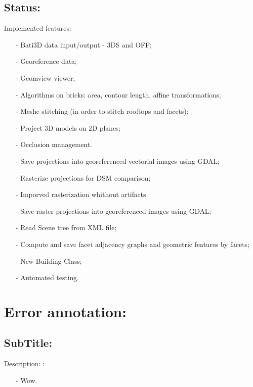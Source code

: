 \documentclass[9pt]{beamer}
\begin{document}
	\subsection[Status]{Status:}
	\begin{frame}[allowframebreaks]{Implemented features:}
		\begin{itemize}
				\item[-] Bati3D data input/output - 3DS and OFF;
				\item[-] Georeference data;
				\item[-] Geomview viewer;
				\item[-] Algorithms on bricks: area, contour length, affine transformations;
				\item[-] Meshe stitching (in order to stitch rooftops and facets);
				\item[-] Project 3D models on 2D planes;
				\item[-] Occlusion management.
				\item[-] Save projections into georeferenced vectorial images using GDAL;
				\framebreak
				\item[-] Rasterize projections for DSM comparison;
				\item[-] Imporved rasterization whithout artifacts.
				\item[-] Save raster projections into georeferenced images using GDAL;
				\item[-] Read Scene tree from XML file;
				\item[-] Compute and save facet adjacency graphs and geometric features by facets;
				\item[-] New Building Class;
				\item[-] Automated testing.
		\end{itemize}
	\end{frame}

	\section[Annotation]{Error annotation:}

	\subsection[SubTitle]{SubTitle:}
	\begin{frame}{Description:}
		:
		\begin{itemize}
			\item[-] Wow.
		\end{itemize}
	\end{frame}
\end{document}
